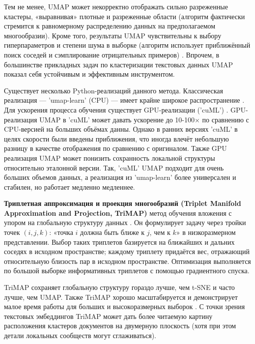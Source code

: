 Тем не менее, UMAP может некорректно отображать сильно разреженные кластеры, «выравнивая» плотные и разреженные
области (алгоритм фактически стремится к равномерному распределению данных на предполагаемом многообразии).
Кроме того, результаты UMAP чувствительны к выбору гиперпараметров и степени шума в выборке (алгоритм использует
приближённый поиск соседей и сэмплирование отрицательных примеров) \parencite{huang2022towards}. Впрочем, в
большинстве прикладных задач по кластеризации текстовых данных UMAP показал себя устойчивым и эффективным
инструментом.

Существует несколько Python-реализаций данного метода. Классическая реализация --- 'umap-learn' (CPU) ---
имеет крайне широкое распространение \parencite{mcinnes2018umap-software}. Для ускорения процесса обучения
существует GPU-реализации ('cuML') \parencite{cuml2020machine}. GPU-реализация UMAP в 'cuML' может давать
ускорение до 10-100× по сравнению с CPU-версией на больших объёмах данны. Однако в ранних версиях 'cuML'
в целях скорости были введены приближения, что иногда влечёт небольшую разницу в качестве отображения
по сравнению с оригиналом. Также GPU реализация UMAP может понизить сохранность локальной структуры
относительно эталонной версии. Так, 'cuML' UMAP подходит для очень больших объемов данных, а реализация
из 'umap-learn' более универсален и стабилен, но работает медленно медленнее.



\textbf{Триплетная аппроксимация и проекция многообразий (Triplet Manifold Approximation and Projection, TriMAP)}
метод обучения вложения с упором на глобальную структуру данных \parencite{TRIMAP2019}. Он формулирует задачу
через тройки точек $(i,j,k)$: «точка $i$ должна быть ближе к $j$, чем к $k$» в низкоразмерном представлении.
Выбор таких триплетов базируется на ближайших и дальних соседях в исходном пространстве; каждому триплету придаётся
вес, отражающий относительную близость пар в исходном пространстве. Оптимизация выполняется по большой выборке
информативных триплетов с помощью градиентного спуска.

TriMAP сохраняет глобальную структуру гораздо лучше, чем t-SNE и часто лучше, чем UMAP. Также TriMAP хорошо
масштабируется и демонстрирует малое время работы для больших и высокоразмерных выборок \parencite{TRIMAP2019}.
С точки зрения текстовых эмбеддингов TriMAP может дать более читаемую картину расположения кластеров документов
на двумерную плоскость (хотя при этом детали локальных сообществ могут сглаживаться).

